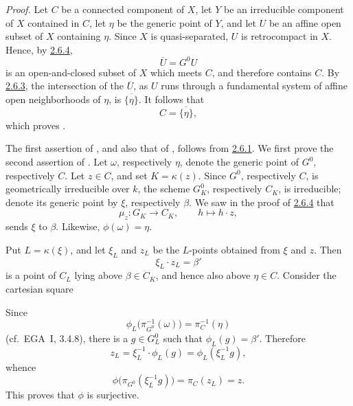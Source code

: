 \noindent\textit{Proof.}
 Let \(C\) be a connected component of \(X\), let \(Y\) be an
irreducible component of \(X\) contained in \(C\), let \(\eta\) be
the generic point of \(Y\), and let \(U\) be an affine open subset of
\(X\) containing \(\eta\). Since \(X\) is quasi-separated, \(U\) is
retrocompact in \(X\). Hence, by
\hyperref[prop:sga3-VIA-2.6.4]{2.6.4},
\[
  \overline U=G^0U
\]
is an open-and-closed subset of \(X\) which meets \(C\), and therefore
contains \(C\). By \hyperref[rem:sga3-VIA-2.6.3]{2.6.3}, the
intersection of the \(\overline U\), as \(U\) runs through a
fundamental system of affine open neighborhoods of \(\eta\), is
\(\overline{\{\eta\}}\). It follows that
\[
  C=\overline{\{\eta\}},
\]
which proves .

The first assertion of , and also that of , follows from
\hyperref[prop:sga3-VIA-2.6.1]{2.6.1}. We first prove the second
assertion of . Let \(\omega\), respectively \(\eta\), denote the
generic point of \(G^0\), respectively \(C\). Let \(z\in C\), and set
\(K=\kappa(z)\). Since \(G^0\), respectively \(C\), is geometrically
irreducible over \(k\), the scheme \(G^0_K\), respectively \(C_K\),
is irreducible; denote its generic point by \(\xi\), respectively
\(\beta\). We saw in the proof of
\hyperref[prop:sga3-VIA-2.6.4]{2.6.4} that
\[
  \mu_z:G_K\longrightarrow C_K,\qquad h\longmapsto h\cdot z,
\]
sends \(\xi\) to \(\beta\). Likewise, \(\phi(\omega)=\eta\).

Put \(L=\kappa(\xi)\), and let \(\xi_L\) and \(z_L\) be the \(L\)-points
obtained from \(\xi\) and \(z\). Then
\[
  \xi_L\cdot z_L=\beta'
\]
is a point of \(C_L\) lying above \(\beta\in C_K\), and hence also
above \(\eta\in C\). Consider the cartesian square
\begin{center}
  \label{diag:sga3-VIA-2.6.6-cartesian-square}%
\end{center}
Since
\[
  \phi_L\bigl(\pi_{G^0}^{-1}(\omega)\bigr)
  =
  \pi_C^{-1}(\eta)
\]
(cf.\ EGA~I, 3.4.8), there is a \(g\in G^0_L\) such that
\(\phi_L(g)=\beta'\). Therefore
\[
  z_L
  =
  \xi_L^{-1}\cdot\phi_L(g)
  =
  \phi_L(\xi_L^{-1}g),
\]
whence
\[
  \phi\bigl(\pi_{G^0}(\xi_L^{-1}g)\bigr)
  =
  \pi_C(z_L)
  =
  z.
\]
This proves that \(\phi\) is surjective.

